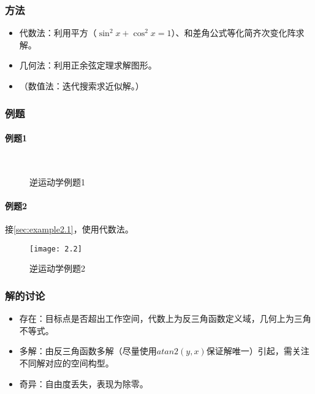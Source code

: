 \documentclass[
12pt, %
a4paper, 
oneside, %
headinclude,footinclude, %
]{scrartcl}
\begin{document}
\subsubsection[方法]{方法}
\begin{itemize}
\item 代数法：利用平方（$ \sin^2x + \cos^2x = 1 $）、和差角公式等化简齐次变化阵求解。
\item 几何法：利用正余弦定理求解图形。
\item （数值法：迭代搜索求近似解。）
\end{itemize} 
\subsubsection[例题]{例题}
\paragraph{例题1}
\begin{figure}[H]
\centering
\subfloat[代数法]{\texttt{[image: 3.1]}} \\
\subfloat[几何法]{\texttt{[image: 3.2]}}
\caption{逆运动学例题1}
\end{figure}
\paragraph{例题2}\label{sec:example2.2}
{\footnotesize 接\ref{sec:example2.1}，使用代数法。}

\begin{figure}[H]
\centering 
\texttt{[image: 2.2]} 
\caption{逆运动学例题2}
\end{figure}
\subsubsection[解的讨论]{解的讨论}
\begin{itemize}
\item 存在：目标点是否超出工作空间，代数上为反三角函数定义域，几何上为三角不等式。
\item 多解：由反三角函数多解（尽量使用$ atan2(y, x) $保证解唯一）引起，需关注不同解对应的空间构型。
\item 奇异：自由度丢失，表现为除零。
\end{itemize} 
\end{document}
